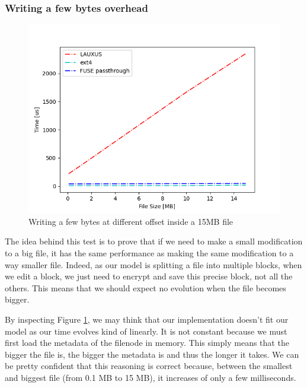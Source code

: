 \documentclass[../main.tex]{subfiles}
\begin{document}
\subsubsection{Writing a few bytes overhead}
\label{section:analysis:write_offset_overhead}
\begin{figure}[h]
    \centering
    \includegraphics[width=.8\textwidth]{images/analysis/per_file_size_small_write}
    
    \caption{Writing a few bytes at different offset inside a 15MB file}
    \label{figure:analysis:perf_write_per_offset}
\end{figure}
\par The idea behind this test is to prove that if we need to make a small modification to a big file, it has the same performance as making the same modification to a way smaller file. Indeed, as our model is splitting a file into multiple blocks, when we edit a block, we just need to encrypt and save this precise block, not all the others. This means that we should expect no evolution when the file becomes bigger.
\par By inspecting Figure \ref{figure:analysis:perf_write_per_offset}, we may think that our implementation doesn't fit our model as our time evolves kind of linearly. It is not constant because we must first load the metadata of the filenode in memory. This simply means that the bigger the file is, the bigger the metadata is and thus the longer it takes. We can be pretty confident that this reasoning is correct because, between the smallest and biggest file (from 0.1 MB to 15 MB), it increases of only a few milliseconds.
\end{document}
